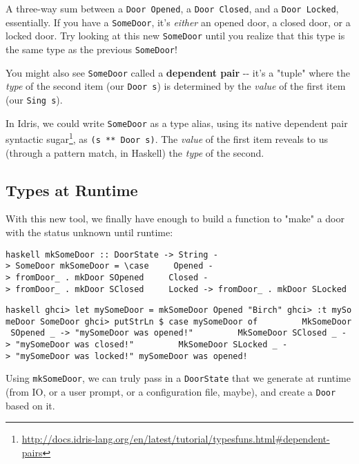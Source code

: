 \documentclass[]{article}
\renewcommand{\href}[2]{#2\footnote{\url{#1}}}
\begin{document}
A three-way sum between a \texttt{Door\ \textquotesingle{}Opened}, a
\texttt{Door\ \textquotesingle{}Closed}, and a
\texttt{Door\ \textquotesingle{}Locked}, essentially. If you have a
\texttt{SomeDoor}, it's \emph{either} an opened door, a closed door, or a locked
door. Try looking at this new \texttt{SomeDoor} until you realize that this type
is the same type as the previous \texttt{SomeDoor}!

You might also see \texttt{SomeDoor} called a \textbf{dependent pair} -\/- it's
a "tuple" where the \emph{type} of the second item (our \texttt{Door\ s}) is
determined by the \emph{value} of the first item (our \texttt{Sing\ s}).

In Idris, we could write \texttt{SomeDoor} as a type alias, using its native
\href{http://docs.idris-lang.org/en/latest/tutorial/typesfuns.html\#dependent-pairs}{dependent
pair syntactic sugar}, as \texttt{(s\ **\ Door\ s)}. The \emph{value} of the
first item reveals to us (through a pattern match, in Haskell) the \emph{type}
of the second.

\subsection{Types at Runtime}

With this new tool, we finally have enough to build a function to "make" a door
with the status unknown until runtime:

\texttt{haskell\ mkSomeDoor\ ::\ DoorState\ -\textgreater{}\ String\ -\textgreater{}\ SomeDoor\ mkSomeDoor\ =\ \textbackslash{}case\ \ \ \ \ Opened\ -\textgreater{}\ fromDoor\_\ .\ mkDoor\ SOpened\ \ \ \ \ Closed\ -\textgreater{}\ fromDoor\_\ .\ mkDoor\ SClosed\ \ \ \ \ Locked\ -\textgreater{}\ fromDoor\_\ .\ mkDoor\ SLocked}

\texttt{haskell\ ghci\textgreater{}\ let\ mySomeDoor\ =\ mkSomeDoor\ Opened\ "Birch"\ ghci\textgreater{}\ :t\ mySomeDoor\ SomeDoor\ ghci\textgreater{}\ putStrLn\ \$\ case\ mySomeDoor\ of\ \ \ \ \ \ \ \ \ MkSomeDoor\ SOpened\ \_\ -\textgreater{}\ "mySomeDoor\ was\ opened!"\ \ \ \ \ \ \ \ \ MkSomeDoor\ SClosed\ \_\ -\textgreater{}\ "mySomeDoor\ was\ closed!"\ \ \ \ \ \ \ \ \ MkSomeDoor\ SLocked\ \_\ -\textgreater{}\ "mySomeDoor\ was\ locked!"\ mySomeDoor\ was\ opened!}

Using \texttt{mkSomeDoor}, we can truly pass in a \texttt{DoorState} that we
generate at runtime (from IO, or a user prompt, or a configuration file, maybe),
and create a \texttt{Door} based on it.
\end{document}
